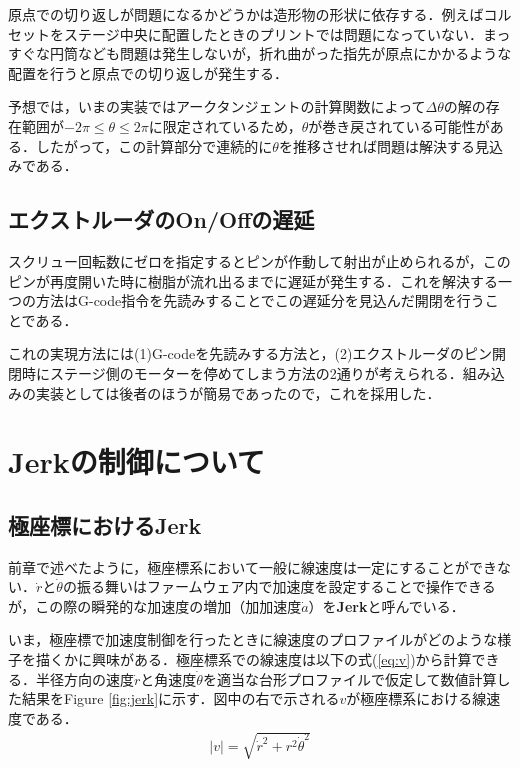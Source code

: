 \documentclass[twocolumn,oneside,a4paper]{article}
\begin{document}
原点での切り返しが問題になるかどうかは造形物の形状に依存する．例えばコルセットをステージ中央に配置したときのプリントでは問題になっていない．まっすぐな円筒なども問題は発生しないが，折れ曲がった指先が原点にかかるような配置を行うと原点での切り返しが発生する．

予想では，いまの実装ではアークタンジェントの計算関数によって$\Delta \theta$の解の存在範囲が$-2 \pi \leq \theta \leq  2 \pi$に限定されているため，$\theta$が巻き戻されている可能性がある．したがって，この計算部分で連続的に$\theta$を推移させれば問題は解決する見込みである．

\subsection{エクストルーダのOn/Offの遅延}
スクリュー回転数にゼロを指定するとピンが作動して射出が止められるが，このピンが再度開いた時に樹脂が流れ出るまでに遅延が発生する．これを解決する一つの方法はG-code指令を先読みすることでこの遅延分を見込んだ開閉を行うことである．

これの実現方法には(1)G-codeを先読みする方法と，(2)エクストルーダのピン開閉時にステージ側のモーターを停めてしまう方法の2通りが考えられる．組み込みの実装としては後者のほうが簡易であったので，これを採用した．

\section{Jerkの制御について}
\subsection{極座標におけるJerk}
前章で述べたように，極座標系において一般に線速度は一定にすることができない．$\dot{r}$と$\dot{\theta}$の振る舞いはファームウェア内で加速度を設定することで操作できるが，この際の瞬発的な加速度の増加（加加速度$\dot{a}$）を{\bf Jerk}と呼んでいる．

いま，極座標で加速度制御を行ったときに線速度のプロファイルがどのような様子を描くかに興味がある．極座標系での線速度は以下の式(\ref{eq:v})から計算できる．半径方向の速度$\dot{r}$と角速度$\dot{\theta}$を適当な台形プロファイルで仮定して数値計算した結果をFigure \ref{fig:jerk}に示す．図中の右で示される$v$が極座標系における線速度である．
\begin{eqnarray}\label{eq:v}
     |v| = \sqrt{ \dot{r}^2+ r^2 \dot{\theta}^2 }
\end{eqnarray}
\end{document}
